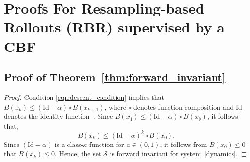 \section{Proofs For Resampling-based Rollouts (RBR) supervised by a CBF}
\subsection{Proof of Theorem~\ref{thm:forward_invariant}}
\begin{proof} \label{proof3.1}
Condition \eqref{eqn:descent_condition} implies that $B(x_{k}) \leq (\text{Id} - \alpha) \circ B(x_{k-1}) $, where $\circ$ denotes function composition and $\mathrm{Id}$
denotes the identity function~\cite{DCBF}. 
Since $B(x_{1}) \leq (\text{Id} - \alpha) \circ B(x_0) $, it follows that,
\begin{equation}\label{induction}
    B(x_k) \leq (\text{Id}-\alpha)^k \circ B(x_0).
\end{equation}
Since $(\text{Id} - \alpha)$ is a class-$\kappa$ function for $a \in (0, 1)$, it follows from $B(x_0) \leq 0$ that $B(x_k) \leq 0$. Hence, the set $\mathcal{S}$ is forward invariant for system~\eqref{dynamics}.
\end{proof}


